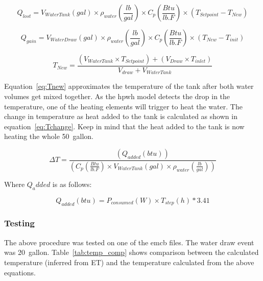 \begin{equation}\label{eq:qlost}
    Q_{lost} = V_{WaterTank} (gal) \times \rho_{water} (\frac{lb}{gal}) \times C_{p} (\frac{Btu}{lb.F}) \times (T_{Set point} - T_{New})
\end{equation}

\begin{equation}\label{eq:qgain}
    Q_{gain} = V_{WaterDraw} (gal) \times \rho_{water} (\frac{lb}{gal}) \times C_{p} (\frac{Btu}{lb.F}) \times (T_{New} - T_{init})
\end{equation}

\begin{equation}\label{eq:Tnew}
    T_{New} = \frac{(V_{WaterTank} \times T_{Set point}) + (V_{Draw} \times T_{inlet})}
    {V_{draw} + V_{WaterTank}}
\end{equation}

\newpage

Equation~\ref{eq:Tnew} approximates the temperature of the tank after both water volumes get mixed together. As the \gls{hpwh} model detects the drop in the temperature, one of the heating elements will trigger to heat the water. The change in temperature as heat added to the tank is calculated as shown in equation~\ref{eq:Tchange}. Keep in mind that the heat added to the tank is now heating the whole 50~gallon.

\begin{equation}\label{eq:Tchange}
    \Delta T = \frac{(Q_{added} (btu))}
    {(C_{p} (\frac{Btu}{lb.F}) \times V_{WaterTank} (gal) \times \rho_{water} (\frac{lb}{gal}))}
\end{equation}
\newline


Where $Q_added$ is as follows:

\begin{equation}\label{eq:Tchang_e}
    Q_{added} (btu) = P_{consumed} (W) \times T_{step} (h) * 3.41
\end{equation}

\subsubsection{Testing}

The above procedure was tested on one of the \gls{emcb} files. The water draw event was 20~gallon. Table~\ref{tab:temp_comp} shows comparison between the calculated temperature (inferred from ET) and the temperature calculated from the above equations.

